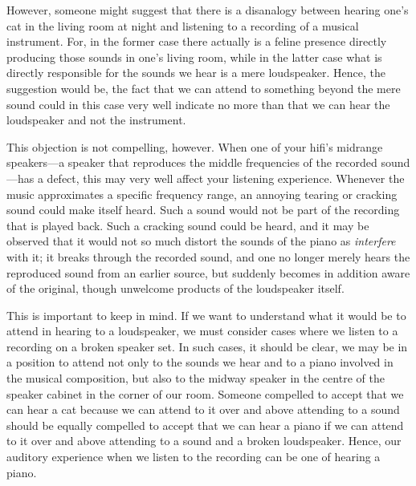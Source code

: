 \documentclass[sloppy, journal, git, bytitle, dodraft]{humapap}
\begin{document}
However, someone might suggest that there is a disanalogy between hearing one's cat in the living room at night and listening to a recording of a musical instrument. For, in the former case there actually is a feline presence directly producing those sounds in one's living room, while in the latter case what is directly responsible for the sounds we hear is a mere loudspeaker. Hence, the suggestion would be, the fact that we can attend to something beyond the mere sound could in this case very well indicate no more than that we can hear the loudspeaker and not the instrument. 

This objection is not compelling, however. When one of your hifi's midrange speakers---a speaker that reproduces the middle frequencies of the recorded sound---has a defect, this may very well affect your listening experience. Whenever the music approximates a specific frequency range, an annoying tearing or cracking sound could make itself heard. Such a sound would not be part of the recording that is played back. Such a cracking sound could be heard, and it may be observed that it would not so much distort the sounds of the piano as \emph{interfere} with it; it breaks through the recorded sound, and one no longer merely hears the reproduced sound from an earlier source, but suddenly becomes in addition aware of the original, though unwelcome products of the loudspeaker itself. 

This is important to keep in mind. If we want to understand what it would be to attend in hearing to a loudspeaker, we must consider cases where we listen to a recording on a broken speaker set. In such cases, it should be clear, we may be in a position to attend not only to the sounds we hear and to a piano involved in the musical composition, but also to the midway speaker in the centre of the speaker cabinet in the corner of our room. Someone compelled to accept that we can hear a cat because we can attend to it over and above attending to a sound should be equally compelled to accept that we can hear a piano if we can attend to it over and above attending to a sound and a broken loudspeaker. Hence, our auditory experience when we listen to the recording can be one of hearing a piano.

\end{document}
